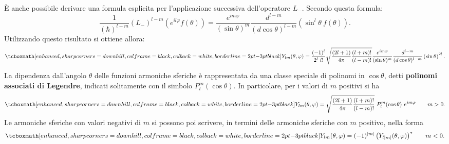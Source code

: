 \documentclass[a4paper,12pt,oneside]{book}
\begin{document}
È anche possibile derivare una formula esplicita per l'applicazione successiva dell'operatore $L_-$. Secondo questa formula:
	\begin{equation}
		\frac{1}{(\hbar) ^{l-m}}(L_-)^{l-m} \left( e^{il\varphi} f(\theta) \right) = \frac{e^{im\varphi}}{(\sin \theta ) ^m} \frac{d^{l-m}}{(d\cos \theta )^{l-m}}\left( \sin ^l \theta \ f(\theta ) \right).
	\end{equation}
Utilizzando questo risultato si ottiene allora:
	\begin{align}
		\tcboxmath[enhanced, sharp corners=downhill, colframe=black, colback=white, borderline={2pt}{-3pt}{black}]{
			Y_{lm} (\theta ,  \varphi ) = \frac{(-1)^{l}}{2^l\ l!}\sqrt{\frac{(2l+1)}{4\pi}\frac{(l+m)!}{(l-m)!}}  \frac{e^{im\varphi}}{(\sin \theta ) ^m} \frac{d^{l-m}}{(d\cos \theta )^{l-m}}\left( \sin  \theta \right) ^{2l}.
			}\nonumber \\[0.1cm] 
	\end{align}
La dipendenza dall'angolo $\theta$ delle funzioni armoniche sferiche è rappresentata da una classe speciale di polinomi in $\cos \theta$, detti \textbf{polinomi associati di Legendre}, indicati solitamente con il simbolo $P_l ^m (\cos \theta)$. In particolare, per i valori di $m$ positivi si ha 
	\begin{equation}
		\tcboxmath[enhanced, sharp corners=downhill, colframe=black, colback=white, borderline={2pt}{-3pt}{black}]{
			Y_{lm} (\theta ,  \varphi ) = \sqrt{\frac{(2l+1)}{4\pi}\frac{(l+m)!}{(l-m)!}}\ P_l ^m (\cos \theta)\ e^{im\varphi}
			}\qquad m>0.
	\end{equation}
Le armoniche sferiche con valori negativi di $m$ si possono poi scrivere, in termini delle armoniche sferiche con $m$ positivo, nella forma
	\begin{equation}
		\tcboxmath[enhanced, sharp corners=downhill, colframe=black, colback=white, borderline={2pt}{-3pt}{black}]{
			Y_{lm} (\theta ,  \varphi ) = (-1)^{|m|}\left(Y_{l|m|} (\theta ,  \varphi )\right) ^*
			} \qquad m<0.
\end{equation}
\end{document}
